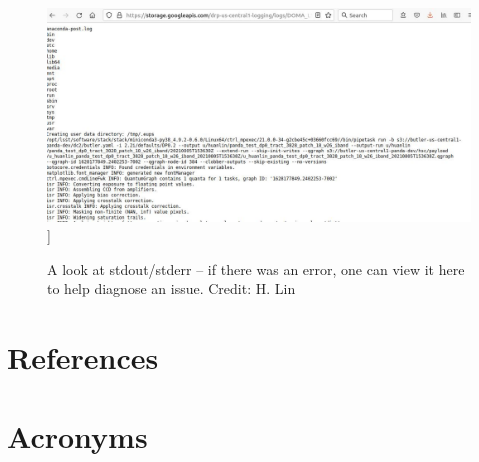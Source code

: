 \documentclass[DM,authoryear,toc]{lsstdoc}
\begin{document}
\begin{figure}
\includegraphics[width=\textwidth]{log1.jpg}]
\caption{A look at stdout/stderr -- if there was an error, one can view it here to help diagnose an issue.
Credit: H. Lin}
\end{figure}

\appendix
\section{References} \label{sec:bib}
\renewcommand{\refname}{} %


\section{Acronyms} \label{sec:acronyms}

\end{document}
